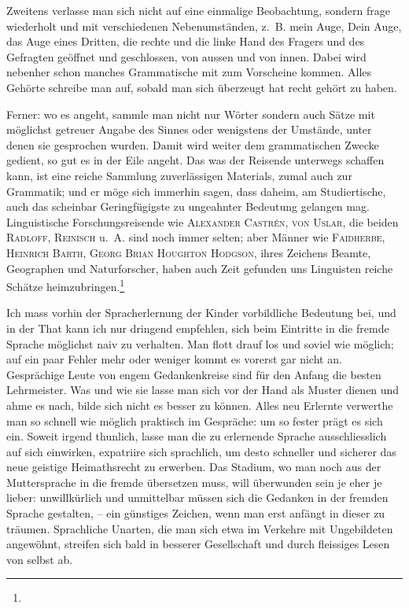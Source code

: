 Zweitens verlasse man sich nicht auf eine einmalige Beobachtung, sondern frage wiederholt und mit verschiedenen Nebenumständen, z.~B. mein Auge, Dein Auge, das Auge eines Dritten, die rechte und die linke Hand des Fragers und des Gefragten geöffnet und geschlossen, von aussen und von innen. Dabei wird nebenher schon manches Grammatische mit zum Vorscheine kommen. Alles Gehörte schreibe man auf, sobald man sich überzeugt hat recht gehört zu haben.

Ferner: wo es angeht, sammle man nicht nur Wörter sondern auch Sätze mit möglichst getreuer Angabe des Sinnes oder wenigstens der Umstände, unter denen sie gesprochen wurden. Damit wird weiter dem grammatischen Zwecke gedient, so gut es in der Eile angeht. Das  was der Reisende unterwegs schaffen kann, ist eine reiche Sammlung zuverlässigen Materials, zumal auch zur Grammatik; und er möge sich immerhin sagen, dass daheim, am Studiertische, auch das scheinbar Geringfügigste zu ungeahnter Bedeutung gelangen mag. Linguistische Forschungsreisende wie \textsc{Alexander Castrén}, \textsc{von Uslar}, die beiden \textsc{Radloff},  \textsc{Reinisch} u.~A. sind noch immer selten; aber Männer wie \textsc{Faidherbe}, \textsc{Heinrich Barth}, \textsc{Georg }  \textsc{Brian Houghton Hodgson}, ihres Zeichens Beamte, Geographen und Naturforscher, haben auch Zeit gefunden uns Linguisten reiche Schätze heimzubringen.\footnote{}

Ich mass vorhin der Spracherlernung der Kinder vorbildliche Bedeutung bei, und in der That kann ich nur dringend empfehlen, sich beim Eintritte in \label{sp.70} die fremde Sprache möglichst naiv zu verhalten. Man  flott drauf los und soviel wie möglich; auf ein paar Fehler mehr oder weniger kommt es vorerst gar nicht an. Gesprächige Leute von engem Gedankenkreise sind für den Anfang die besten Lehrmeister. Was und wie sie  lasse man sich vor \label{fp.71} der Hand als Muster dienen und ahme es nach, bilde sich nicht  es besser zu können. Alles neu Erlernte verwerthe man so schnell wie möglich praktisch im Gespräche: um so fester prägt es sich ein. Soweit irgend thunlich, lasse man die zu erlernende Sprache ausschliesslich auf sich einwirken, expatriire sich sprachlich, um desto schneller und sicherer das neue geistige Heimathsrecht zu erwerben. Das Stadium, wo man noch aus der Muttersprache in die fremde übersetzen muss, will überwunden sein je eher je lieber: unwillkürlich und unmittelbar müssen sich die Gedanken in der fremden Sprache gestalten, – ein günstiges Zeichen, wenn man erst anfängt in dieser zu träumen. Sprachliche Unarten, die man sich etwa im Verkehre mit Ungebildeten angewöhnt, streifen sich bald in besserer Gesellschaft und durch fleissiges Lesen von selbst ab.

